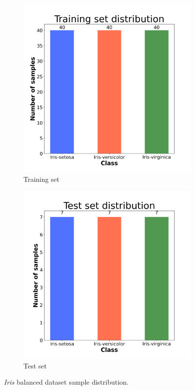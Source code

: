\begin{figure}[H]
    \centering
    \begin{subfigure}[t]{0.45\textwidth}
        \centering
        \includegraphics[width=1\textwidth]{images/exper1/iris/train_dist.png}
        \caption{Training set}
    \end{subfigure}
    \begin{subfigure}[t]{0.45\textwidth}
        \centering
        \includegraphics[width=1\textwidth]{images/exper1/iris/test_dist.png}
        \caption{Test set}
    \end{subfigure}
    \caption{\textit{Iris} balanced dataset sample distribution.}
\end{figure}

